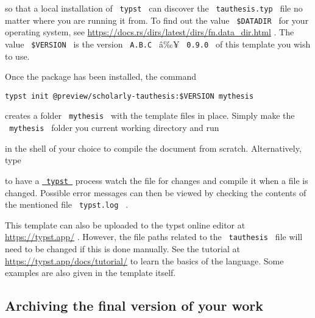 so that a local installation of \texttt{\ typst\ } can discover the
\texttt{\ tauthesis.typ\ } file no matter where you are running it from.
To find out the value \texttt{\ \$DATADIR\ } for your operating system,
see \url{https://docs.rs/dirs/latest/dirs/fn.data_dir.html} . The value
\texttt{\ \$VERSION\ } is the version \texttt{\ A.B.C\ } â‰¥
\texttt{\ 0.9.0\ } of this template you wish to use.

Once the package has been installed, the command

\begin{verbatim}
typst init @preview/scholarly-tauthesis:$VERSION mythesis
\end{verbatim}

creates a folder \texttt{\ mythesis\ } with the template files in place.
Simply make the \texttt{\ mythesis\ } folder you current working
directory and run

\begin{Shaded}
\begin{Highlighting}[]
\end{Highlighting}
\end{Shaded}

in the shell of your choice to compile the document from scratch.
Alternatively, type

\begin{Shaded}
\begin{Highlighting}[]
\OperatorTok{\&\textgreater{}}\KeywordTok{\&}
\end{Highlighting}
\end{Shaded}

to have a \href{https://github.com/typst/typst}{\texttt{\ typst\ }}
process watch the file for changes and compile it when a file is
changed. Possible error messages can then be viewed by checking the
contents of the mentioned file \texttt{\ typst.log\ } .

This template can also be uploaded to the typst online editor at
\url{https://typst.app/} . However, the file paths related to the
\texttt{\ tauthesis\ } file will need to be changed if this is done
manually. See the tutorial at \url{https://typst.app/docs/tutorial/} to
learn the basics of the language. Some examples are also given in the
template itself.

\subsection{Archiving the final version of your
work}\label{archiving-the-final-version-of-your-work}

